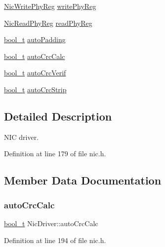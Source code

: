 \begin{DoxyCompactItemize}
\item 
\hyperlink{nic_8h_a5b15217319f2376ad4dd5c883ee6924a}{Nic\+Write\+Phy\+Reg} \hyperlink{structNicDriver_af7e678d0b00c8903e00ca02fa0b7bdf4}{write\+Phy\+Reg}
\item 
\hyperlink{nic_8h_a0d400b31f6491d5bdb45075c389fac19}{Nic\+Read\+Phy\+Reg} \hyperlink{structNicDriver_a391490ad2030e1e8debdede59084c8ad}{read\+Phy\+Reg}
\item 
\hyperlink{compiler__port_8h_a812d16e5494522586b3784e55d479912}{bool\+\_\+t} \hyperlink{structNicDriver_a978ec36d7efa3b3cd7587fd49fff76a1}{auto\+Padding}
\item 
\hyperlink{compiler__port_8h_a812d16e5494522586b3784e55d479912}{bool\+\_\+t} \hyperlink{structNicDriver_a3a9fa80b60cfeeeb3bc7a9ada4127227}{auto\+Crc\+Calc}
\item 
\hyperlink{compiler__port_8h_a812d16e5494522586b3784e55d479912}{bool\+\_\+t} \hyperlink{structNicDriver_a0c806f14051b7763449f8b7282f38aae}{auto\+Crc\+Verif}
\item 
\hyperlink{compiler__port_8h_a812d16e5494522586b3784e55d479912}{bool\+\_\+t} \hyperlink{structNicDriver_a2ef86b970c6097e2441e3e02a02a8593}{auto\+Crc\+Strip}
\end{DoxyCompactItemize}


\subsection{Detailed Description}
N\+IC driver. 

Definition at line 179 of file nic.\+h.



\subsection{Member Data Documentation}
\mbox{\label{structNicDriver_a3a9fa80b60cfeeeb3bc7a9ada4127227}} 
\subsubsection{\texorpdfstring{auto\+Crc\+Calc}{autoCrcCalc}}
{\footnotesize\ttfamily \hyperlink{compiler__port_8h_a812d16e5494522586b3784e55d479912}{bool\+\_\+t} Nic\+Driver\+::auto\+Crc\+Calc}



Definition at line 194 of file nic.\+h.


